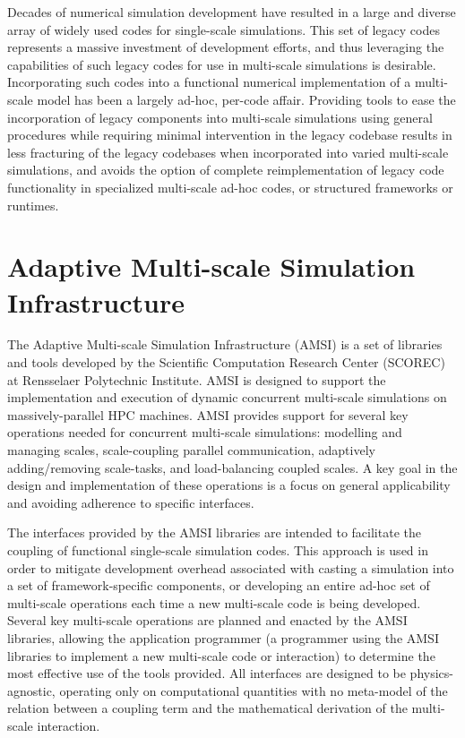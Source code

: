 \documentclass[11pt]{article}
\begin{document}
Decades of numerical simulation development have resulted in a large and diverse array of widely used codes for single-scale simulations.
This set of legacy codes represents a massive investment of development efforts, and thus leveraging the capabilities of such legacy codes for use in multi-scale simulations is desirable.
Incorporating such codes into a functional numerical implementation of a multi-scale model has been a largely ad-hoc, per-code affair.
Providing tools to ease the incorporation of legacy components into multi-scale simulations using general procedures while requiring minimal intervention in the legacy codebase results in less fracturing of the legacy codebases when incorporated into varied multi-scale simulations, and avoids the option of complete reimplementation of legacy code functionality in specialized multi-scale ad-hoc codes, or structured frameworks or runtimes.

\section{Adaptive Multi-scale Simulation Infrastructure}\label{AMSI}
The Adaptive Multi-scale Simulation Infrastructure (AMSI) is a set of libraries and tools developed by the Scientific Computation Research Center (SCOREC) at Rensselaer Polytechnic Institute.
AMSI is designed to support the implementation and execution of dynamic concurrent multi-scale simulations on massively-parallel HPC machines.
AMSI provides support for several key operations needed for concurrent multi-scale simulations: modelling and managing scales, scale-coupling parallel communication, adaptively adding/removing scale-tasks, and load-balancing coupled scales.
A key goal in the design and implementation of these operations is a focus on general applicability and avoiding adherence to specific interfaces.

The interfaces provided by the AMSI libraries are intended to facilitate the coupling of functional single-scale simulation codes.
This approach is used in order to mitigate development overhead associated with casting a simulation into a set of framework-specific components, or developing an entire ad-hoc set of multi-scale operations each time a new multi-scale code is being developed.
Several key multi-scale operations are planned and enacted by the AMSI libraries, allowing the application programmer (a programmer using the AMSI libraries to implement a new multi-scale code or interaction) to determine the most effective use of the tools provided.
All interfaces are designed to be physics-agnostic, operating only on computational quantities with no meta-model of the relation between a coupling term and the mathematical derivation of the multi-scale interaction.
\end{document}
